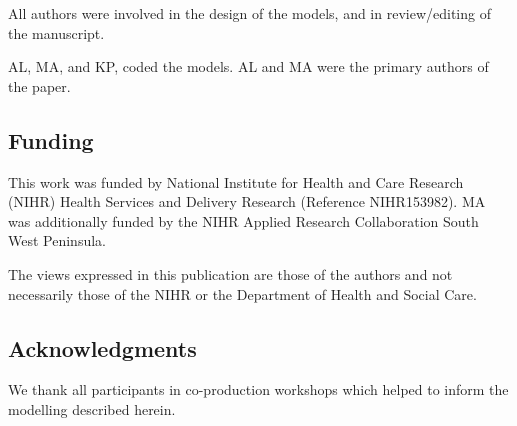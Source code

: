 All authors were involved in the design of the models, and in review/editing of the manuscript.

AL, MA, and KP, coded the models. AL and MA were the primary authors of the paper.


\subsection*{Funding}

This work was funded by National Institute for Health and Care Research (NIHR) Health Services and Delivery Research (Reference NIHR153982). MA was additionally funded by the NIHR Applied Research Collaboration South West Peninsula.

The views expressed in this publication are those of the authors and not necessarily those
of the NIHR or the Department of Health and Social Care.

\subsection*{Acknowledgments}

We thank all participants in co-production workshops which helped to inform the modelling described herein.